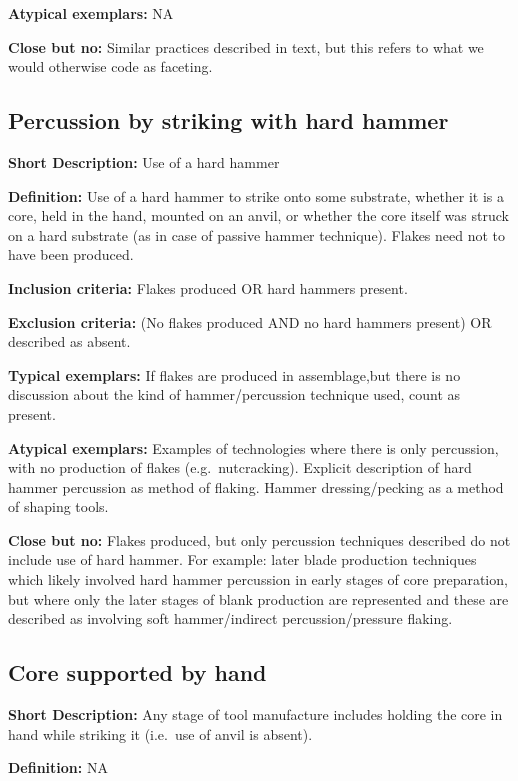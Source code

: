 \documentclass[
]{article}
\begin{document}
\textbf{Atypical exemplars:} NA

\textbf{Close but no:} Similar practices described in text, but this
refers to what we would otherwise code as faceting.

\subsection{Percussion by striking with hard
hammer}\label{percussion-by-striking-with-hard-hammer}

\textbf{Short Description:} Use of a hard hammer

\textbf{Definition:} Use of a hard hammer to strike onto some substrate,
whether it is a core, held in the hand, mounted on an anvil, or whether
the core itself was struck on a hard substrate (as in case of passive
hammer technique). Flakes need not to have been produced.

\textbf{Inclusion criteria:} Flakes produced OR hard hammers present.

\textbf{Exclusion criteria:} (No flakes produced AND no hard hammers
present) OR described as absent.

\textbf{Typical exemplars:} If flakes are produced in assemblage,but
there is no discussion about the kind of hammer/percussion technique
used, count as present.

\textbf{Atypical exemplars:} Examples of technologies where there is
only percussion, with no production of flakes (e.g.~nutcracking).
Explicit description of hard hammer percussion as method of flaking.
Hammer dressing/pecking as a method of shaping tools.

\textbf{Close but no:} Flakes produced, but only percussion techniques
described do not include use of hard hammer. For example: later blade
production techniques which likely involved hard hammer percussion in
early stages of core preparation, but where only the later stages of
blank production are represented and these are described as involving
soft hammer/indirect percussion/pressure flaking.

\subsection{Core supported by hand}\label{core-supported-by-hand}

\textbf{Short Description:} Any stage of tool manufacture includes
holding the core in hand while striking it (i.e.~use of anvil is
absent).

\textbf{Definition:} NA
\end{document}
